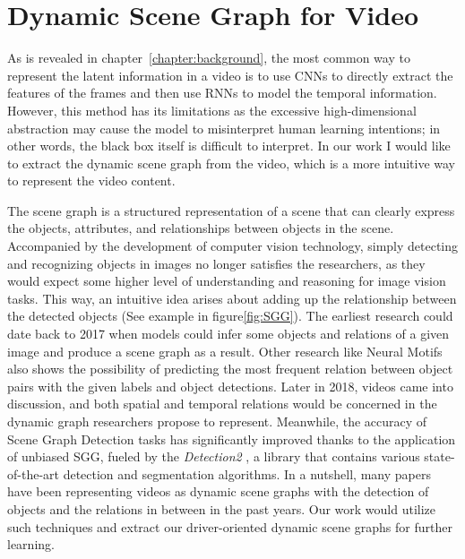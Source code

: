 \section{Dynamic Scene Graph for Video}

As is revealed in chapter~\ref{chapter:background}, the most common way to represent the latent information in a video is to use CNNs to directly extract the features of the frames and then use RNNs to model the temporal information. However, this method has its limitations as the excessive high-dimensional abstraction may cause the model to misinterpret human learning intentions; in other words, the black box itself is difficult to interpret. In our work I would like to extract the dynamic scene graph from the video, which is a more intuitive way to represent the video content.

The scene graph is a structured representation of a scene that can clearly express the objects, attributes, and relationships between objects in the scene\cite{9661322}. Accompanied by the development of computer vision technology, simply detecting and recognizing objects in images no longer satisfies the researchers, as they would expect some higher level of understanding and reasoning for image vision tasks. This way, an intuitive idea arises about adding up the relationship between the detected objects (See example in figure\ref{fig:SGG}). The earliest research could date back to 2017 when models could infer some objects and relations of a given image and produce a scene graph as a result\cite{xu2017scene}. Other research like Neural Motifs\cite{zellers2018neural} also shows the possibility of predicting the most frequent relation between object pairs with the given labels and object detections. Later in 2018, videos came into discussion, and both spatial and temporal relations would be concerned in the dynamic graph researchers propose to represent\cite{wang2018videos}.
Meanwhile, the accuracy of Scene Graph Detection tasks has significantly improved thanks to the application of unbiased SGG\cite{wang2018videos}, fueled by the \textit{Detection2} \cite{wu2019detectron2}, a library that contains various state-of-the-art detection and segmentation algorithms. In a nutshell, many papers have been representing videos as dynamic scene graphs with the detection of objects and the relations in between in the past years. Our work would utilize such techniques and extract our driver-oriented dynamic scene graphs for further learning.

